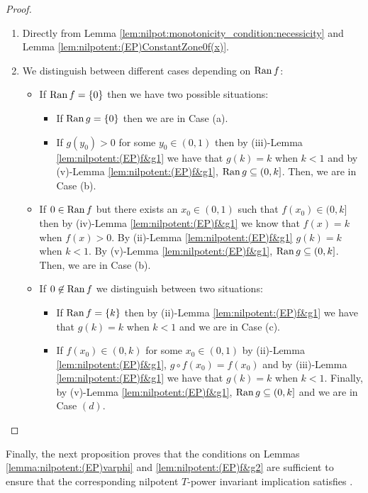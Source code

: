 \begin{proof}
	\begin{enumerate}[label=(\roman*)]
		\item Directly from Lemma \ref{lem:nilpot:monotonicity_condition:necessicity} and Lemma \ref{lem:nilpotent:(EP)ConstantZone0f(x)}.
		\item We distinguish between different cases depending on $\operatorname{Ran} f$:
		\begin{itemize}
			\item If $\operatorname{Ran} f = \{0\}$ then we have two possible situations:
			\begin{itemize}
				\item If $\operatorname{Ran} g =\{0\}$ then we are in Case (a).
				\item If $g(y_0) > 0$ for some $y_0 \in (0,1)$ then by (iii)-Lemma \ref{lem:nilpotent:(EP)f&g1} we have that $g(k)=k$ when $k<1$ and by (v)-Lemma \ref{lem:nilpotent:(EP)f&g1}, $\operatorname{Ran} g  \subseteq (0,k]$. Then, we are in Case (b).
			\end{itemize}
			\item If $0 \in \operatorname{Ran} f$  but there exists an $x_0 \in (0,1)$ such that $f(x_0) \in (0,k]$ then by (iv)-Lemma \ref{lem:nilpotent:(EP)f&g1} we know that $f(x)=k$ when $f(x)>0$. By (ii)-Lemma \ref{lem:nilpotent:(EP)f&g1} $g(k)=k$ when $k < 1$. By (v)-Lemma \ref{lem:nilpotent:(EP)f&g1}, $\operatorname{Ran} g \subseteq (0,k]$. Then, we are in Case (b).
			\item If $0 \not \in \operatorname{Ran} f$ we distinguish between two situations:
			\begin{itemize}
				\item If $\operatorname{Ran} f = \{k\}$ then by (ii)-Lemma \ref{lem:nilpotent:(EP)f&g1} we have that $g(k)=k$ when $k<1$ and we are in Case (c).
				\item If $f(x_0) \in (0,k)$ for some $x_0 \in (0,1)$ by (ii)-Lemma \ref{lem:nilpotent:(EP)f&g1}, $g \circ f(x_0)=f(x_0)$ and by (iii)-Lemma \ref{lem:nilpotent:(EP)f&g1} we have that $g(k)=k$ when $k<1$. Finally, by (v)-Lemma \ref{lem:nilpotent:(EP)f&g1}, $\operatorname{Ran} g \subseteq (0,k]$ and we are in Case $(d)$.
			\end{itemize}
		\end{itemize}
	\end{enumerate}
\end{proof}

Finally, the next proposition proves that the conditions on Lemmas \ref{lemma:nilpotent:(EP)varphi} and \ref{lem:nilpotent:(EP)f&g2} are sufficient to ensure that the corresponding nilpotent $T$-power invariant implication satisfies \EP.


